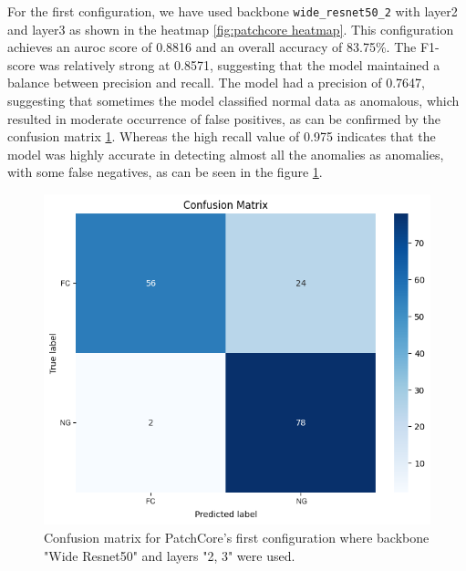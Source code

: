 For the first configuration, we have used backbone \texttt{wide\_resnet50\_2} with layer2 and layer3 as shown in the heatmap \ref{fig:patchcore heatmap}. This configuration achieves an \gls{auroc} score of 0.8816 and an overall accuracy of 83.75\%. The F1-score was relatively strong at 0.8571, suggesting that the model maintained a balance between precision and recall. The model had a precision of 0.7647, suggesting that sometimes the model classified normal data as anomalous, which resulted in moderate occurrence of false positives, as can be confirmed by the confusion matrix \ref{fig:patchcore config1 confusion matrix}. Whereas the high recall value of 0.975 indicates that the model was highly accurate in detecting almost all the anomalies as anomalies, with some false negatives, as can be seen in the figure \ref{fig:patchcore config1 confusion matrix}.

\begin{figure}[ht!]
    \centering
    \includegraphics[width=1\linewidth]{Rohit_Master_Thesis//Images/patchcore_config1_confusion_matrix.png}
    \caption{Confusion matrix for PatchCore's first configuration where backbone "Wide Resnet50" and layers "2, 3" were used.}
    \label{fig:patchcore config1 confusion matrix}
\end{figure}

